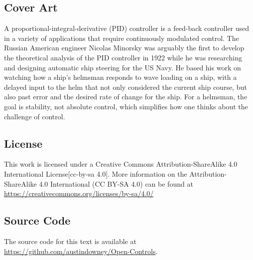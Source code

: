\documentclass[12pt,letter]{article}
\numberwithin{ex}{section} %
\numberwithin{re}{section} %
\numberwithin{equation}{section}	%
\begin{document}
\subsection*{Cover Art}
A proportional-integral-derivative (PID) controller is a feed-back controller used in a variety of applications that require continuously modulated control. The Russian American engineer Nicolas Minorsky was arguably the first to develop the theoretical analysis of the PID controller in 1922  while he was researching and designing automatic ship steering for the US Navy. He based his work on watching how a ship's helmsman responds to wave loading on a ship, with a delayed input to the helm that not only considered the current ship course, but also past error and the desired rate of change for the ship. For a helmsman, the goal is stability, not absolute control, which simplifies how one thinks about the challenge of control.

\subsection*{License}
This work is licensed under a Creative Commons Attribution-ShareAlike 4.0 International License[cc-by-sa 4.0]. More information on the Attribution-ShareAlike 4.0 International (CC BY-SA 4.0) can be found at  \url{https://creativecommons.org/licenses/by-sa/4.0/}

\subsection*{Source Code}
The source code for this text is available at \url{https://github.com/austindowney/Open-Controls}.


\pagebreak

\tableofcontents

\pagebreak


%
\end{document}
